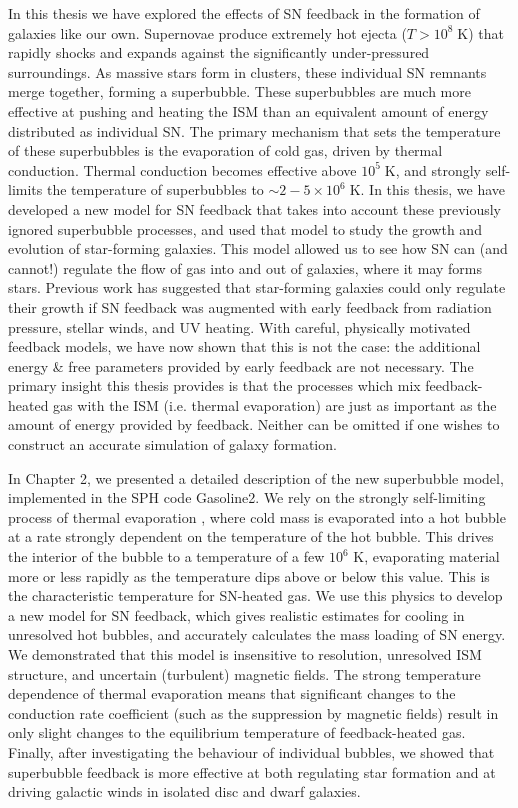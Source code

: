 In this thesis we have explored the effects of SN feedback in the formation of
galaxies like our own.  Supernovae produce extremely hot ejecta
($T>10^8\;\mathrm{K}$) that rapidly shocks and expands against the significantly
under-pressured surroundings.  As massive stars form in clusters, these
individual SN remnants merge together, forming a superbubble.  These
superbubbles are much more effective at pushing and heating the ISM than an
equivalent amount of energy distributed as individual SN.  The primary mechanism
that sets the temperature of these superbubbles is the evaporation of cold gas,
driven by thermal conduction.  Thermal conduction becomes effective above
$10^5\;\mathrm{K}$, and strongly self-limits the temperature of superbubbles to
$\sim2-5\times10^6\;\mathrm{K}$.  In this thesis, we have developed a new model
for SN feedback that takes into account these previously ignored superbubble
processes, and used that model to study the growth and evolution of star-forming
galaxies.  This model allowed us to see how SN can (and cannot!) regulate the
flow of gas into and out of galaxies, where it may forms stars.  Previous work
\citep{Stinson2013,Hopkins2014} has suggested that star-forming galaxies could
only regulate their growth if SN feedback was augmented with early feedback from
radiation pressure, stellar winds, and UV heating.  With careful, physically
motivated feedback models, we have now shown that this is not the case:  the
additional energy \& free parameters provided by early feedback are not
necessary.  The primary insight this thesis provides is that the processes
which mix feedback-heated gas with the ISM (i.e. thermal evaporation) are
just as important as the amount of energy provided by feedback.  Neither can be
omitted if one wishes to construct an accurate simulation of galaxy formation.  

In Chapter 2, we presented a detailed description of the new superbubble model,
implemented in the SPH code {\sc Gasoline2}.  We rely on the strongly
self-limiting process of thermal evaporation \citep{Cowie1977}, where cold mass
is evaporated into a hot bubble at a rate strongly dependent on the temperature
of the hot bubble. This drives the interior of the bubble to a temperature of a
few $10^6$ K, evaporating material more or less rapidly as the temperature dips
above or below this value.  This is the characteristic temperature for SN-heated
gas.  We use this physics to develop a new model for SN feedback, which gives
realistic estimates for cooling in unresolved hot bubbles, and accurately
calculates the mass loading of SN energy.  We demonstrated that this model is
insensitive to resolution, unresolved ISM structure, and uncertain (turbulent)
magnetic fields.  The strong temperature dependence of thermal evaporation means
that significant changes to the conduction rate coefficient (such as the suppression by
magnetic fields) result in only slight changes to the equilibrium temperature of
feedback-heated gas.  Finally, after investigating the behaviour of individual
bubbles, we showed that superbubble feedback is more effective at both
regulating star formation and at driving galactic winds in isolated disc and
dwarf galaxies.

